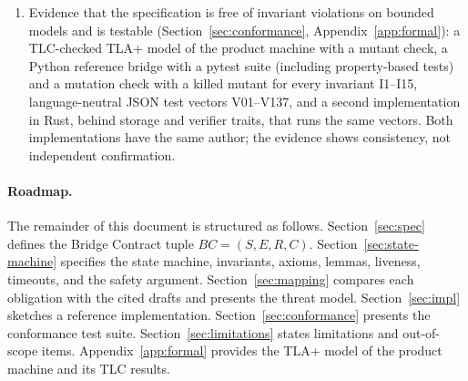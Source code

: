 \begin{enumerate}[leftmargin=2em]
the contract without requiring changes to AGTP, GAR, or PACE
(Section~\ref{sec:impl}).
\item Evidence that the specification is free of invariant violations on bounded models and is testable
(Section~\ref{sec:conformance}, Appendix~\ref{app:formal}): a TLC-checked
TLA+ model of the product machine with a mutant check, a Python
reference bridge with a pytest suite (including
property-based tests) and a mutation check with a killed mutant for
every invariant I1--I15, language-neutral JSON
test vectors V01--V137, and a second implementation in Rust, behind storage and
verifier traits, that runs the same vectors. Both implementations have the same author; the evidence shows
consistency, not independent confirmation.
\end{enumerate}

\paragraph{Roadmap.} The remainder of this document is structured as
follows. Section~\ref{sec:spec} defines the Bridge Contract tuple
$BC = (S, E, R, C)$. Section~\ref{sec:state-machine} specifies the
state machine, invariants, axioms, lemmas, liveness, timeouts, and
the safety argument. Section~\ref{sec:mapping} compares each obligation with
the cited drafts and presents the threat model.
Section~\ref{sec:impl} sketches a reference implementation.
Section~\ref{sec:conformance} presents the conformance test suite.
Section~\ref{sec:limitations} states limitations and out-of-scope
items. Appendix~\ref{app:formal} provides the TLA+ model of the product
machine and its TLC results.

